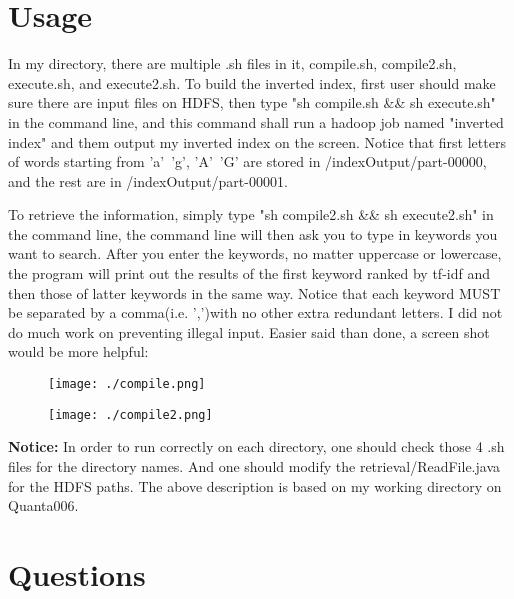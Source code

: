 \documentclass[12pt,a4paper]{article}
\begin{document}
\section{Usage}
In my directory, there are multiple .sh files in it, compile.sh, compile2.sh, execute.sh, and execute2.sh. To build the inverted index, first user should make sure there are input files on HDFS, then type "sh compile.sh  \&\& sh execute.sh" in the command line, and this command shall run a hadoop job named "inverted index" and them output my inverted index on the screen. Notice that first letters of words starting from 'a'~'g', 'A'~'G' are stored in /indexOutput/part-00000, and the rest are in /indexOutput/part-00001. 

To retrieve the information, simply type "sh compile2.sh  \&\& sh execute2.sh" in the command line, the command line will then ask you to type in keywords you want to search. After you enter the keywords, no matter uppercase or lowercase, the program will print out the results of the first keyword ranked by tf-idf and then those of latter keywords in the same way. Notice that each keyword MUST be separated by a comma(i.e. ',')with no other extra redundant letters. I did not do much work on preventing illegal input.
Easier said than done, a screen shot would be more helpful:
\begin{figure}[h!]
  \centering
      \texttt{[image: ./compile.png]}
\end{figure}
\begin{figure}[h!]
  \centering
      \texttt{[image: ./compile2.png]}
\end{figure}

{\bf Notice:} In order to run correctly on each directory, one should check those 4 .sh files for the directory names. And one should modify the retrieval/ReadFile.java for the HDFS paths. The above description is based on my working directory on Quanta006.
\section{Questions}
\end{document}
